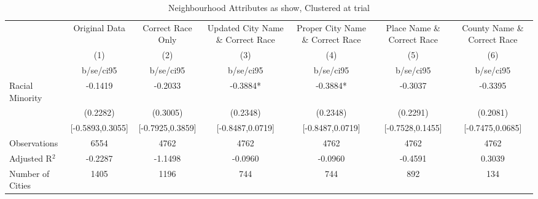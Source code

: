 \documentclass{article}
\begin{document}
\begin{table}[htbp]\centering
\def\sym#1{\ifmmode^{#1}\else\(^{#1}\)\fi}
\caption{Neighbourhood Attributes as show, Clustered at trial}
\begin{tabular}{l*{6}{c}}
\toprule
                    &\multicolumn{1}{c}{Original Data}&\multicolumn{1}{c}{Correct Race Only}&\multicolumn{1}{c}{Updated City Name \& Correct Race}&\multicolumn{1}{c}{Proper City Name \& Correct Race}&\multicolumn{1}{c}{Place Name \& Correct Race}&\multicolumn{1}{c}{County Name \& Correct Race}\\\cmidrule(lr){2-2}\cmidrule(lr){3-3}\cmidrule(lr){4-4}\cmidrule(lr){5-5}\cmidrule(lr){6-6}\cmidrule(lr){7-7}
                    &\multicolumn{1}{c}{(1)}   &\multicolumn{1}{c}{(2)}   &\multicolumn{1}{c}{(3)}   &\multicolumn{1}{c}{(4)}   &\multicolumn{1}{c}{(5)}   &\multicolumn{1}{c}{(6)}   \\
                    &   b/se/ci95   &   b/se/ci95   &   b/se/ci95   &   b/se/ci95   &   b/se/ci95   &   b/se/ci95   \\
\midrule
Racial Minority     &     -0.1419   &     -0.2033   &     -0.3884*  &     -0.3884*  &     -0.3037   &     -0.3395   \\
                    &    (0.2282)   &    (0.3005)   &    (0.2348)   &    (0.2348)   &    (0.2291)   &    (0.2081)   \\
                    &[-0.5893,0.3055]   &[-0.7925,0.3859]   &[-0.8487,0.0719]   &[-0.8487,0.0719]   &[-0.7528,0.1455]   &[-0.7475,0.0685]   \\
\midrule
Observations        &        6554   &        4762   &        4762   &        4762   &        4762   &        4762   \\
Adjusted R$^2$      &     -0.2287   &     -1.1498   &     -0.0960   &     -0.0960   &     -0.4591   &      0.3039   \\
Number of Cities    &        1405   &        1196   &         744   &         744   &         892   &         134   \\
\bottomrule
\end{tabular}
\end{table}
\end{document}
